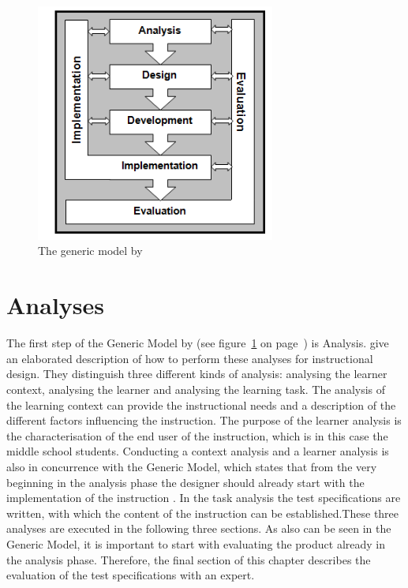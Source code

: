 \documentclass[11pt,twoside]{report} %
\begin{document}
\begin{figure}[h]
\centering
\includegraphics[width=0.7\textwidth]{genericmodel}
\caption{The generic model by \protect{}\label{fig:genericmodel}}
\end{figure}


\part{Analyses}
\thispagestyle{fancy}

The first step of the Generic Model by  (see figure~\ref{fig:genericmodel} on page~\pageref{fig:genericmodel}) is Analysis.  give an elaborated description of how to perform these analyses for instructional design. They distinguish three different kinds of analysis: analysing the learner context, analysing the learner and analysing the learning task. The analysis of the learning context can provide the instructional needs and a description of the different factors influencing the instruction. The purpose of the learner analysis is the characterisation of the end user of the instruction, which is in this case the middle school students. Conducting a context analysis and a learner analysis is also in concurrence with the Generic Model, which states that from the very beginning in the analysis phase the designer should already start with the implementation of the instruction \cite{genericmodel}. In the task analysis the test specifications are written, with which the content of the instruction can be established.These three analyses are executed in the following three sections. As also can be seen in the Generic Model, it is important to start with evaluating the product already in the analysis phase. Therefore, the final section of this chapter describes the evaluation of the test specifications with an expert.
\end{document}

